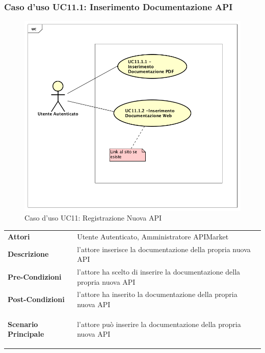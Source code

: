 \subsubsection{Caso d'uso UC11.1: Inserimento Documentazione API}
\label{UC11.1}
\begin{figure}[ht]
	\centering
	\includegraphics[scale=0.45]{UML/UC11_1.png}
	\caption{Caso d'uso UC11: Registrazione Nuova API}
\end{figure}

\renewcommand*{\arraystretch}{1.6}
\begin{longtable}{ l | p{11cm}}
	\hline
	\rowcolor{Gray}
	\multicolumn{2}{c}{UC11.1: Inserimento Documentazione API} \\
	\hline
	\textbf{Attori} &Utente Autenticato, Amministratore APIMarket \\
	\textbf{Descrizione} & l'attore inserisce la documentazione della propria nuova API \\
	\textbf{Pre-Condizioni} &  l'attore ha scelto di inserire la documentazione della propria nuova API\\
	\textbf{Post-Condizioni}&l'attore ha inserito la documentazione della propria nuova API\\
	\textbf{Scenario Principale} & \begin{enumerate*}[label=(\arabic*.),itemjoin={\newline}]
			\item l'attore può inserire la documentazione della propria nuova API
	\end{enumerate*}\\
\end{longtable}


